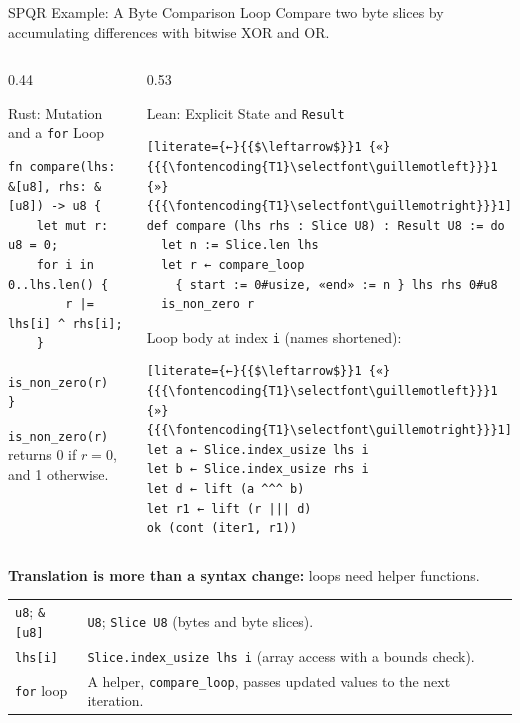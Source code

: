 \documentclass[aspectratio=169,xcolor=dvipsnames]{beamer}
\begin{document}
\begin{frame}[fragile]{SPQR Example: A Byte Comparison Loop}
    \small
    Compare two byte slices by accumulating differences with bitwise XOR and OR.
    \begin{columns}[T,onlytextwidth]
        \begin{column}{0.44\textwidth}
            \begin{block}{Rust: Mutation and a \texttt{for} Loop}
\begin{lstlisting}
fn compare(lhs: &[u8], rhs: &[u8]) -> u8 {
    let mut r: u8 = 0;
    for i in 0..lhs.len() {
        r |= lhs[i] ^ rhs[i];
    }
    is_non_zero(r)
}
\end{lstlisting}
            \end{block}
            \footnotesize
            \texttt{is\_non\_zero(r)} returns 0 if $r=0$, and 1 otherwise.
        \end{column}
        \begin{column}{0.53\textwidth}
            \begin{block}{Lean: Explicit State and \texttt{Result}}
\begin{lstlisting}[literate={←}{{$\leftarrow$}}1 {«}{{{\fontencoding{T1}\selectfont\guillemotleft}}}1 {»}{{{\fontencoding{T1}\selectfont\guillemotright}}}1]
def compare (lhs rhs : Slice U8) : Result U8 := do
  let n := Slice.len lhs
  let r ← compare_loop
    { start := 0#usize, «end» := n } lhs rhs 0#u8
  is_non_zero r
\end{lstlisting}
                \footnotesize Loop body at index \texttt{i} (names shortened):
\begin{lstlisting}[literate={←}{{$\leftarrow$}}1 {«}{{{\fontencoding{T1}\selectfont\guillemotleft}}}1 {»}{{{\fontencoding{T1}\selectfont\guillemotright}}}1]
let a ← Slice.index_usize lhs i
let b ← Slice.index_usize rhs i
let d ← lift (a ^^^ b)
let r1 ← lift (r ||| d)
ok (cont (iter1, r1))
\end{lstlisting}
            \end{block}
        \end{column}
    \end{columns}
    \footnotesize
    \textbf{Translation is more than a syntax change:} loops need helper functions.
    \begin{tabular}{@{}p{}p{}@{}}
        \texttt{u8}; \texttt{\&[u8]} & \texttt{U8}; \texttt{Slice U8} (bytes and byte slices). \\
        \texttt{lhs[i]} & \texttt{Slice.index\_usize lhs i} (array access with a bounds check). \\
        \texttt{for} loop & A helper, \texttt{compare\_loop}, passes updated values to the next iteration. \\
    \end{tabular}
\end{frame}
\end{document}
